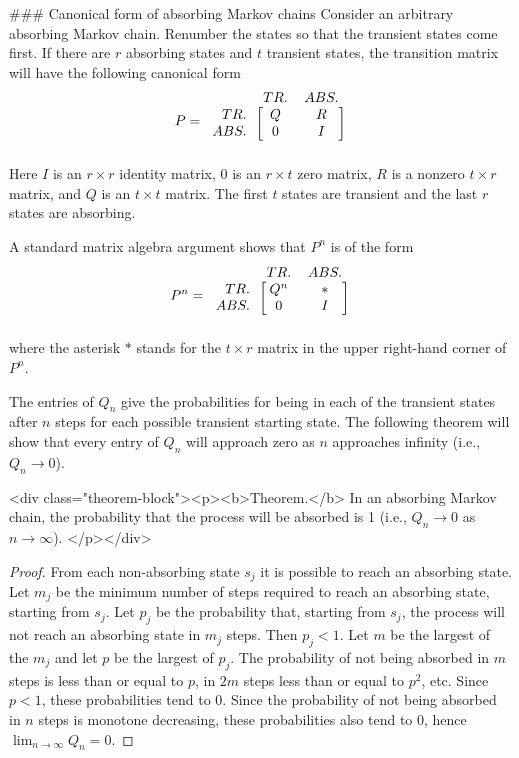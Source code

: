 ### Canonical form of absorbing Markov chains
Consider an arbitrary absorbing Markov chain. Renumber the states so that the transient states come first. If there are $r$ absorbing states and $t$ transient states, the transition matrix will have the following canonical form
$$\begin{equation}
    P = 
    \begin{blockarray}{rcc}
        & TR. & ABS. \\
    \begin{block}{r[cc]}
        TR. & Q &  R \\
        ABS. & 0 &  I \\
    \end{block}
    \end{blockarray}
\end{equation}$$
Here $I$ is an $r\times r$ identity matrix, $0$ is an $r\times t$ zero matrix, $R$ is a nonzero $t\times r$ matrix, and $Q$ is an $t\times t$ matrix. The first $t$ states are transient and the last $r$ states are absorbing.

A standard matrix algebra argument shows that $P^n$ is of the form
$$\begin{equation}
    P^n = 
    \begin{blockarray}{rcc}
        & TR. & ABS. \\
    \begin{block}{r[cc]}
        TR. & Q^n &  * \\
        ABS. & 0 &  I \\
    \end{block}
    \end{blockarray}
\end{equation}$$
where the asterisk $*$ stands for the $t\times r$ matrix in the upper right-hand corner of $P^n$. 

The entries of $Q_n$ give the probabilities for being in each of the transient states after $n$ steps for each possible transient starting state. The following theorem will show that every entry of $Q_n$ will approach zero as $n$ approaches infinity (i.e., $Q_n \to 0$).

<div class="theorem-block"><p><b>Theorem.</b> 
In an absorbing Markov chain, the probability that the process will be absorbed is 1 (i.e., $Q_n \to 0$ as $n \to \infty$).
</p></div>

\begin{proof}
From each non-absorbing state $s_j$ it is possible to reach an absorbing state. Let $m_j$ be the minimum number of steps required to reach an absorbing state, starting from $s_j$. Let $p_j$ be the probability that, starting from $s_j$, the process will not reach an absorbing state in $m_j$ steps. Then $p_j < 1$. Let $m$ be the largest of the $m_j$ and let $p$ be the largest of $p_j$. The probability of not being absorbed in $m$ steps is less than or equal to $p$, in $2m$ steps less than or equal to $p^2$, etc. Since $p < 1$, these probabilities tend to 0. Since the probability of not being absorbed in $n$ steps is monotone decreasing, these probabilities also tend to 0, hence $\lim_{n\to\infty} Q_n = 0$.
\end{proof}

